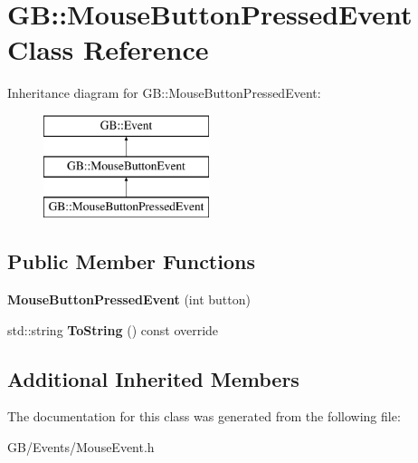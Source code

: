 \hypertarget{class_g_b_1_1_mouse_button_pressed_event}{}\section{GB\+::Mouse\+Button\+Pressed\+Event Class Reference}
\label{class_g_b_1_1_mouse_button_pressed_event}
Inheritance diagram for GB\+::Mouse\+Button\+Pressed\+Event\+:\begin{figure}[H]
\begin{center}
\leavevmode
\includegraphics[height=3.000000cm]{class_g_b_1_1_mouse_button_pressed_event}
\end{center}
\end{figure}
\subsection*{Public Member Functions}
\begin{DoxyCompactItemize}
\item 
\mbox{\label{class_g_b_1_1_mouse_button_pressed_event_a511ec03a72a38fdf1ad29ed95d894e8a}} 
{\bfseries Mouse\+Button\+Pressed\+Event} (int button)
\item 
\mbox{\label{class_g_b_1_1_mouse_button_pressed_event_ab704bd0635f286c57e07eb3a73178f04}} 
std\+::string {\bfseries To\+String} () const override
\end{DoxyCompactItemize}
\subsection*{Additional Inherited Members}


The documentation for this class was generated from the following file\+:\begin{DoxyCompactItemize}
\item 
G\+B/\+Events/Mouse\+Event.\+h\end{DoxyCompactItemize}
